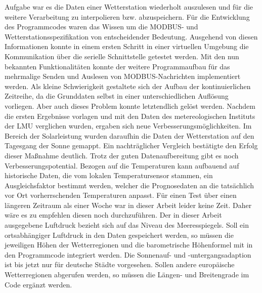 Aufgabe war es die Daten einer Wetterstation wiederholt auszulesen und für die weitere Verarbeitung zu interpolieren bzw. abzuspeichern. Für die Entwicklung des Programmcodes waren das Wissen um die MODBUS- und Wetterstationsspezifikation von entscheidender Bedeutung. Ausgehend von diesen Informationen konnte in einem ersten Schritt in einer virtuellen Umgebung die Kommunikation über die serielle Schnittstelle getestet werden. Mit den nun bekannten Funktionalitäten konnte der weitere Programmaufbau für das mehrmalige Senden und Auslesen von MODBUS-Nachrichten implementiert werden. Als kleine Schwierigkeit gestaltete sich der Aufbau der kontinuierlichen Zeitreihe, da die Grunddaten selbst in einer unterschiedlichen Auflösung vorliegen. Aber auch dieses Problem konnte letztendlich gelöst werden. Nachdem die ersten Ergebnisse vorlagen und mit den Daten des metereologischen Instituts der LMU verglichen wurden, ergaben sich neue Verbesserungsmöglichkeiten. Im Bereich der Solarleistung wurden daraufhin die Daten der Wetterstation auf den Tagesgang der Sonne gemappt. Ein nachträglicher Vergleich bestätigte den Erfolg dieser Maßnahme deutlich. Trotz der guten Datenaufbereitung gibt es noch Verbesserungspotential. Bezogen auf die Temperaturen kann aufbauend auf historische Daten, die vom lokalen Temperatursensor stammen, ein Ausgleichsfaktor bestimmt werden, welcher die Prognosedaten an die tatsächlich vor Ort vorherrschenden Temperaturen anpasst. Für einen Test über einen längeren Zeitraum als einer Woche war in dieser Arbeit leider keine Zeit. Daher wäre es zu empfehlen diesen noch durchzuführen. Der in dieser Arbeit ausgegebene Luftdruck bezieht sich auf das Niveau des Meeresspiegels. Soll ein ortsabhängiger Luftdruck in den Daten gespeichert werden, so müssen die jeweiligen Höhen der Wetterregionen und die barometrische Höhenformel mit in den Programmcode integriert werden. Die Sonnenauf- und -untergangsadaption ist bis jetzt nur für deutsche Städte vorgesehen. Sollen andere europäische Wetterregionen abgerufen werden, so müssen die Längen- und Breitengrade im Code ergänzt werden.     